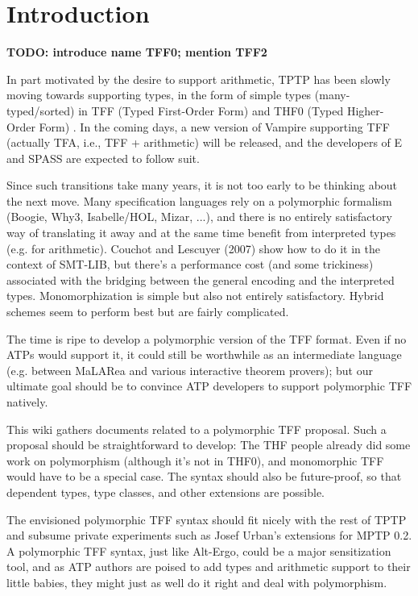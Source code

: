 \section{Introduction}
\label{sec_intro}

\textbf{TODO: introduce name TFF0; mention TFF2}

In part motivated by the desire to support arithmetic, TPTP has been slowly
moving towards supporting types, in the form of simple types (many-typed/sorted)
in TFF (Typed First-Order Form) \cite{TFF0} and THF0 (Typed Higher-Order Form)
\cite{xxx}. In the coming days, a new version of Vampire supporting TFF
(actually TFA, i.e., TFF + arithmetic) will be released, and the developers of E
and SPASS are expected to follow suit.

Since such transitions take many years, it is not too early to be thinking about
the next move. Many specification languages rely on a polymorphic formalism
(Boogie, Why3, Isabelle/HOL, Mizar, ...), and there is no entirely satisfactory
way of translating it away and at the same time benefit from interpreted types
(e.g. for arithmetic). Couchot and Lescuyer (2007) show how to do it in the
context of SMT-LIB, but there's a performance cost (and some trickiness)
associated with the bridging between the general encoding and the interpreted
types. Monomorphization is simple but also not entirely satisfactory. Hybrid
schemes seem to perform best but are fairly complicated.

The time is ripe to develop a polymorphic version of the TFF format. Even if no
ATPs would support it, it could still be worthwhile as an intermediate language
(e.g. between MaLARea and various interactive theorem provers); but our ultimate
goal should be to convince ATP developers to support polymorphic TFF natively.

This wiki gathers documents related to a polymorphic TFF proposal. Such a
proposal should be straightforward to develop: The THF people already did some
work on polymorphism (although it's not in THF0), and monomorphic TFF would have
to be a special case. The syntax should also be future-proof, so that dependent
types, type classes, and other extensions are possible.

The envisioned polymorphic TFF syntax should fit nicely with the rest of TPTP
and subsume private experiments such as Josef Urban's extensions for MPTP 0.2. A
polymorphic TFF syntax, just like Alt-Ergo, could be a major sensitization tool,
and as ATP authors are poised to add types and arithmetic support to their
little babies, they might just as well do it right and deal with polymorphism.

